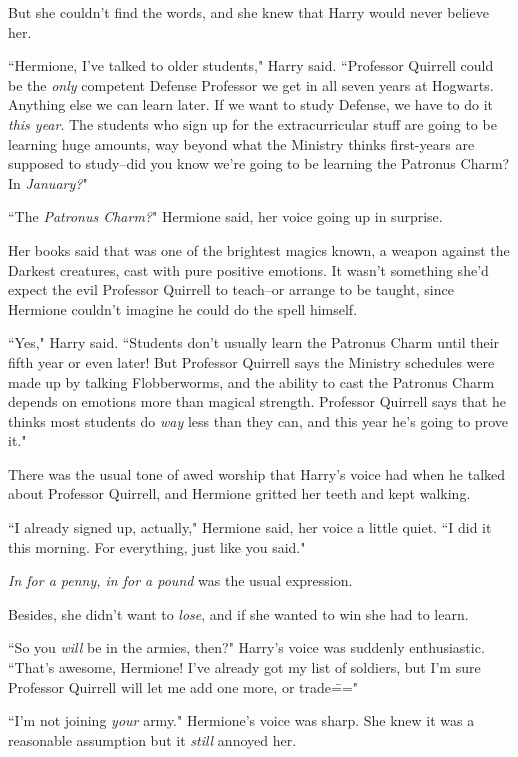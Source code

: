 But she couldn't find the words, and she knew that Harry would never believe her.

``Hermione, I've talked to older students," Harry said. ``Professor Quirrell could be the \emph{only} competent Defense Professor we get in all seven years at Hogwarts. Anything else we can learn later. If we want to study Defense, we have to do it \emph{this year}. The students who sign up for the extracurricular stuff are going to be learning huge amounts, way beyond what the Ministry thinks first-years are supposed to study\---did you know we're going to be learning the Patronus Charm? In \emph{January?}"

``The \emph{Patronus Charm?}" Hermione said, her voice going up in surprise.

Her books said that was one of the brightest magics known, a weapon against the Darkest creatures, cast with pure positive emotions. It wasn't something she'd expect the evil Professor Quirrell to teach\---or arrange to be taught, since Hermione couldn't imagine he could do the spell himself.

``Yes," Harry said. ``Students don't usually learn the Patronus Charm until their fifth year or even later! But Professor Quirrell says the Ministry schedules were made up by talking Flobberworms, and the ability to cast the Patronus Charm depends on emotions more than magical strength. Professor Quirrell says that he thinks most students do \emph{way} less than they can, and this year he's going to prove it."

There was the usual tone of awed worship that Harry's voice had when he talked about Professor Quirrell, and Hermione gritted her teeth and kept walking.

``I already signed up, actually," Hermione said, her voice a little quiet. ``I did it this morning. For everything, just like you said."

\emph{In for a penny, in for a pound} was the usual expression.

Besides, she didn't want to \emph{lose}, and if she wanted to win she had to learn.

``So you \emph{will} be in the armies, then?" Harry's voice was suddenly enthusiastic. ``That's awesome, Hermione! I've already got my list of soldiers, but I'm sure Professor Quirrell will let me add one more, or trade\==="

``I'm not joining \emph{your} army." Hermione's voice was sharp. She knew it was a reasonable assumption but it \emph{still} annoyed her.

